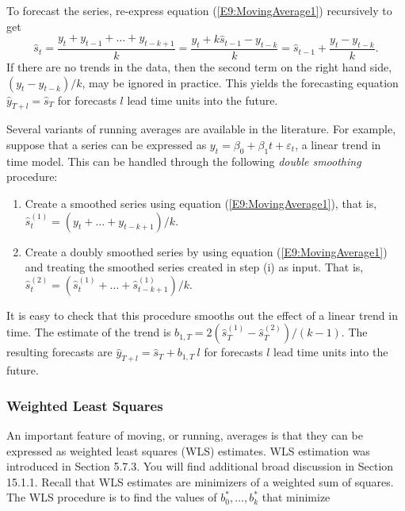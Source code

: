 \bigskip
To forecast the series, re-express equation
(\ref{E9:MovingAverage1}) recursively to get
\begin{equation}\label{E9:MovingAverag2}
\widehat{s}_t = \frac{y_t + y_{t-1} + \ldots + y_{t-k+1}}{k} =
\frac{y_t + k \widehat{s}_{t-1} - y_{t-k}}{k} = \widehat{s}_{t-1} +
\frac{y_t-y_{t-k}}{k}.
\end{equation}
If there are no trends in the data, then the second term on the
right hand side, $(y_t-y_{t-k})/k$, may be ignored in practice. This
yields the forecasting equation $\widehat{y}_{T+l} = \widehat{s}_T$
for forecasts $l$ lead time units into the future.

Several variants of running averages are available in the
literature. For example, suppose that a series can be expressed as
$y_t = \beta_0 + \beta_1 t + \varepsilon_t$, a linear trend in time
model. This can be handled through the following \emph{double
smoothing} procedure:

\begin{enumerate}
\item Create a smoothed series using equation (\ref{E9:MovingAverage1}), that
is, $\widehat{s}_t^{(1)}=(y_t+\ldots+y_{t-k+1})/k.$

\item Create a doubly smoothed series by using equation (\ref{E9:MovingAverage1})
and treating the smoothed series created in step (i) as input. That
is, $\widehat{s}_t^{(2)} = (\widehat{s}_t^{(1)} + \ldots +
\widehat{s}_{t-k+1}^{(1)})/k.$
\end{enumerate}
It is easy to check that this procedure smooths out the effect of a
linear trend in time. The estimate of the trend is $b_{1,T}=2\left(
\widehat{s}_T^{(1)}-\widehat{s}_T^{(2)}\right) /(k-1)$. The
resulting forecasts are $\widehat{y}_{T+l} = \widehat{s}_T +
b_{1,T}~l$ for forecasts $l$ lead time units into the future.

\subsubsection*{Weighted Least Squares}

An important feature of moving, or running, averages is that they
can be expressed as weighted least squares (WLS) estimates. WLS
estimation was introduced in Section 5.7.3. You will find additional
broad discussion in Section 15.1.1. Recall that WLS estimates are
minimizers of a weighted sum of squares. The WLS procedure is to
find the values of $b_0^{\ast}, \ldots, b_{k}^{\ast}$ that
minimize

